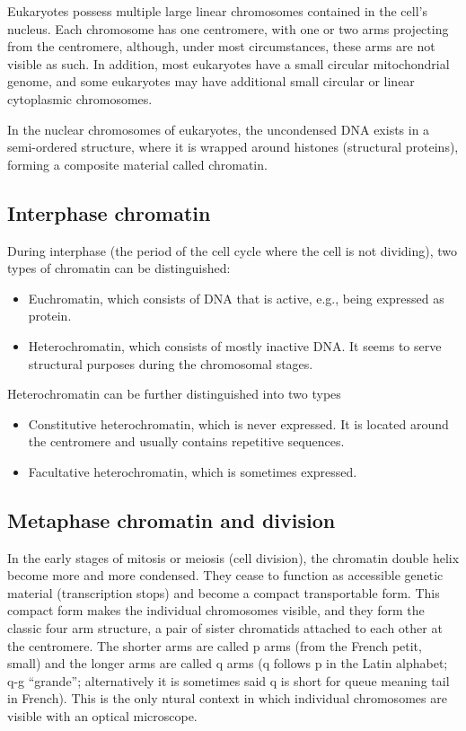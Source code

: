 Eukaryotes possess multiple large linear chromosomes contained in the cell's nucleus. Each chromosome has one centromere, with one or two arms projecting from the centromere, although, under most circumstances, these arms are not visible as such. In addition, most eukaryotes have a small circular mitochondrial genome, and some eukaryotes may have additional small circular or linear cytoplasmic chromosomes.

In the nuclear chromosomes of eukaryotes, the uncondensed DNA exists in a semi-ordered structure, where it is wrapped around histones (structural proteins), forming a composite material called chromatin.

\hypertarget{interphase-chromatin}{%
\subsection{Interphase chromatin}\label{interphase-chromatin}}

During interphase (the period of the cell cycle where the cell is not dividing), two types of chromatin can be distinguished:

\begin{itemize}
\tightlist
\item
  Euchromatin, which consists of DNA that is active, e.g., being expressed as protein.
\item
  Heterochromatin, which consists of mostly inactive DNA. It seems to serve structural purposes during the chromosomal stages.
\end{itemize}

Heterochromatin can be further distinguished into two types

\begin{itemize}
\tightlist
\item
  Constitutive heterochromatin, which is never expressed. It is located around the centromere and usually contains repetitive sequences.
\item
  Facultative heterochromatin, which is sometimes expressed.
\end{itemize}

\hypertarget{metaphase-chromatin-and-division}{%
\subsection{Metaphase chromatin and division}\label{metaphase-chromatin-and-division}}

In the early stages of mitosis or meiosis (cell division), the chromatin double helix become more and more condensed. They cease to function as accessible genetic material (transcription stops) and become a compact transportable form. This compact form makes the individual chromosomes visible, and they form the classic four arm structure, a pair of sister chromatids attached to each other at the centromere. The shorter arms are called p arms (from the French petit, small) and the longer arms are called q arms (q follows p in the Latin alphabet; q-g ``grande''; alternatively it is sometimes said q is short for queue meaning tail in French). This is the only ntural context in which individual chromosomes are visible with an optical microscope.

